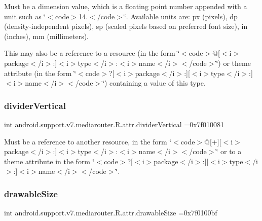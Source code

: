 Must be a dimension value, which is a floating point number appended with a unit such as \char`\"{}$<$code$>$14.\+5sp$<$/code$>$\char`\"{}. Available units are\+: px (pixels), dp (density-\/independent pixels), sp (scaled pixels based on preferred font size), in (inches), mm (millimeters). 

This may also be a reference to a resource (in the form \char`\"{}$<$code$>$@\mbox{[}$<$i$>$package$<$/i$>$\+:\mbox{]}$<$i$>$type$<$/i$>$\+:$<$i$>$name$<$/i$>$$<$/code$>$\char`\"{}) or theme attribute (in the form \char`\"{}$<$code$>$?\mbox{[}$<$i$>$package$<$/i$>$\+:\mbox{]}\mbox{[}$<$i$>$type$<$/i$>$\+:\mbox{]}$<$i$>$name$<$/i$>$$<$/code$>$\char`\"{}) containing a value of this type. \mbox{\label{classandroid_1_1support_1_1v7_1_1mediarouter_1_1R_1_1attr_a682a495d66b60b4085b3e2eb570f2f79}} 
\subsubsection{\texorpdfstring{divider\+Vertical}{dividerVertical}}
{\footnotesize\ttfamily int android.\+support.\+v7.\+mediarouter.\+R.\+attr.\+divider\+Vertical =0x7f010081\hspace{0.3cm}{\ttfamily [static]}}

Must be a reference to another resource, in the form \char`\"{}$<$code$>$@\mbox{[}+\mbox{]}\mbox{[}$<$i$>$package$<$/i$>$\+:\mbox{]}$<$i$>$type$<$/i$>$\+:$<$i$>$name$<$/i$>$$<$/code$>$\char`\"{} or to a theme attribute in the form \char`\"{}$<$code$>$?\mbox{[}$<$i$>$package$<$/i$>$\+:\mbox{]}\mbox{[}$<$i$>$type$<$/i$>$\+:\mbox{]}$<$i$>$name$<$/i$>$$<$/code$>$\char`\"{}. \mbox{\label{classandroid_1_1support_1_1v7_1_1mediarouter_1_1R_1_1attr_a757642cadfbbf0eb88e795794f658959}} 
\subsubsection{\texorpdfstring{drawable\+Size}{drawableSize}}
{\footnotesize\ttfamily int android.\+support.\+v7.\+mediarouter.\+R.\+attr.\+drawable\+Size =0x7f0100bf\hspace{0.3cm}{\ttfamily [static]}}

